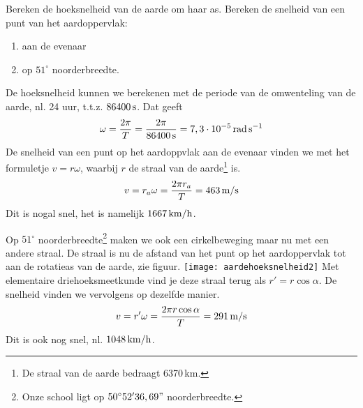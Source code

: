 \documentclass{ximera}
\begin{document}
\begin{exercise}[Opgave] Bereken de hoeksnelheid van de aarde om haar as. Bereken de
snelheid van een punt van het aardoppervlak:
\begin{enumerate}
\item aan de evenaar
\item op $51^\circ$ noorderbreedte.
\end{enumerate}
\begin{oplossing}
De hoeksnelheid kunnen we berekenen met de periode van de omwenteling van de aarde, nl. 24 uur, t.t.z. $86400\rm\,s$. Dat geeft
\begin{eqnarray*}
\omega=\frac{2\pi}{T}=\frac{2\pi}{86400\rm\,s}=7,3\cdot10^{-5}\rm\,rad\,s^{-1}
\end{eqnarray*}
De snelheid van een punt op het aardoppvlak aan de evenaar vinden we met het formuletje $v=r\omega$, waarbij $r$ de straal van de aarde\footnote{De straal van de aarde bedraagt 6370\rm\,km.} is.
\begin{eqnarray*}
v=r_a\omega=\frac{2\pi r_a}{T}=463\rm\,m/s
\end{eqnarray*}
Dit is nogal snel, het is namelijk $1667\rm\,km/h$. 

Op $51^\circ$ noorderbreedte\footnote{Onze school ligt op $50^\circ 52'36,69"$ noorderbreedte.} maken we ook een cirkelbeweging maar nu met een andere straal. De straal is nu de afstand van het punt op het aardoppervlak tot aan de rotatieas van de aarde, zie figuur. 
\centering
\texttt{[image: aardehoeksnelheid2]}
Met elementaire driehoeksmeetkunde vind je deze straal terug als $r'=r\cos\alpha$. De snelheid vinden we vervolgens op dezelfde manier.
\begin{eqnarray*}
v=r'\omega=\frac{2\pi r\cos\alpha}{T}=291\rm\,m/s
\end{eqnarray*}
Dit is ook nog snel, nl. $1048\rm\,km/h$.
\end{oplossing}



\end{exercise}
\end{document}
